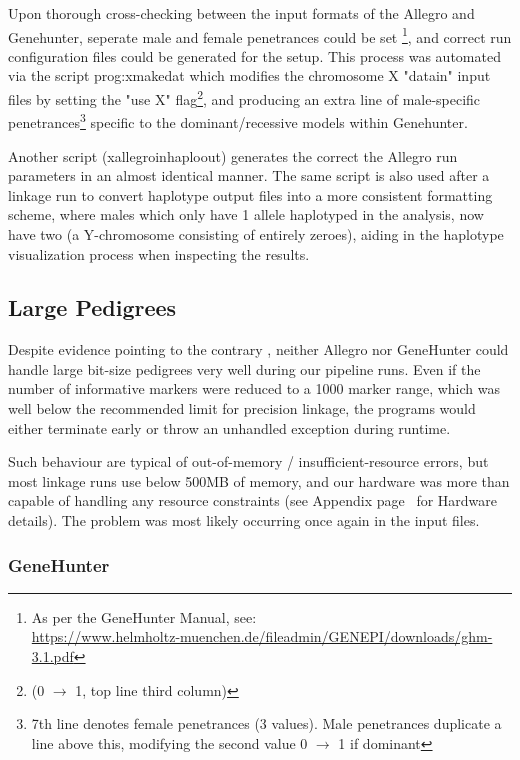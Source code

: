 Upon thorough cross-checking between the input formats of the Allegro and Genehunter, seperate male and female penetrances could be set \footnote{As per the GeneHunter Manual, see:\\\url{https://www.helmholtz-muenchen.de/fileadmin/GENEPI/downloads/ghm-3.1.pdf}}, and correct run configuration files could be generated for the setup. This process was automated via the script \gls{prog:xmakedat} which modifies the chromosome X "datain" input files by setting the "use X" flag\footnote{(0 $\rightarrow$ 1, top line third column)}, and producing an extra line of male-specific penetrances\footnote{7th line denotes female penetrances (3 values). Male penetrances duplicate a line above this, modifying the second value 0 $\rightarrow$ 1 if dominant} specific to the dominant/recessive models within Genehunter.

Another script (xallegroinhaploout) generates the correct the Allegro run parameters in an almost identical manner. The same script is also used after a linkage run to convert haplotype output files into a more consistent formatting scheme, where males which only have 1 allele haplotyped in the analysis, now have two (a Y-chromosome consisting of entirely zeroes), aiding in the haplotype visualization process when inspecting the results.


\subsection{Large Pedigrees}\label{ref:meth:largepeds}

Despite evidence pointing to the contrary \citep{allegro_2005,ghm_2014}, neither Allegro nor GeneHunter could handle large bit-size pedigrees very well during our pipeline runs. Even if the number of informative markers were reduced to a 1000 marker range, which was well below the recommended limit for precision linkage, the programs would either terminate early or throw an unhandled exception during runtime. 

Such behaviour are typical of out-of-memory / insufficient-resource errors, but most linkage runs use below 500MB of memory, and our hardware was more than capable of handling any resource constraints (see Appendix page~\pageref{ref:app:hwspec} for Hardware details). The problem was most likely occurring once again in the input files.

\subsubsection{GeneHunter}

